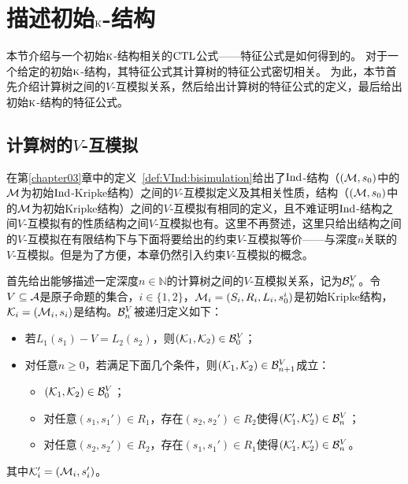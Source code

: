 \section{描述初始$\textsc{k}$-结构}\label{sec:chapter06_chaIntC}
本节介绍与一个初始$\textsc{k}$-结构相关的$\textrm{CTL}$公式——特征公式是如何得到的。
对于一个给定的初始$\textsc{k}$-结构，其特征公式其计算树的特征公式密切相关。
为此，本节首先介绍计算树之间的$V$-互模拟关系，然后给出计算树的特征公式的定义，最后给出初始$\textsc{k}$-结构的特征公式。

\subsection{计算树的$V$-互模拟}
在第\ref{chapter03}章中的定义~\ref{def:VInd:bisimulation}给出了$\textrm{Ind}$-结构（$({\cal M},s_0)$中的${\cal M}$为初始$\textrm{Ind}$-Kripke结构）之间的$V$-互模拟定义及其相关性质，结构（$({\cal M},s_0)$中的${\cal M}$为初始Kripke结构）之间的$V$-互模拟有相同的定义，且不难证明$\textrm{Ind}$-结构之间$V$-互模拟有的性质结构之间$V$-互模拟也有。这里不再赘述，这里只给出结构之间的$V$-互模拟在有限结构下与下面将要给出的约束$V$-互模拟等价——与深度$n$关联的$V$-互模拟。但是为了方便，本章仍然引入约束$V$-互模拟的概念。

首先给出能够描述一定深度$n\in \mathbb{N}$的计算树之间的$V$-互模拟关系，记为${\cal B}_n^V$。令$V\subseteq {\cal A}$是原子命题的集合，$i\in \{1,2\}$，${\cal M}_i=(S_i,R_i,L_i,s_0^i)$是初始Kripke结构，${\cal K}_i=({\cal M}_i, s_i)$是结构。${\cal B}_n^V$被递归定义如下：
\begin{itemize}
	\item 若$L_1(s_1)-V=L_2(s_2)$，则$({\cal K}_1,{\cal K}_2) \in {\cal B}_0^V$；
	\item 对任意$n\ge 0$，若满足下面几个条件，则$({\cal K}_1,{\cal K}_2)\in {\cal B}_{n+1}^V$成立：
	\begin{itemize}
		\item $({\cal K}_1,{\cal K}_2) \in {\cal B}_0^V$；
		\item 对任意$(s_1,s_1')\in R_1$，存在$(s_2,s_2')\in R_2$使得$({\cal K}_1',{\cal K}_2') \in {\cal B}_n^V$；
		\item 对任意$(s_2,s_2')\in R_2$，存在$(s_1,s_1')\in R_1$使得$({\cal K}_1',{\cal K}_2') \in {\cal B}_n^V$。
	\end{itemize}
\end{itemize}
其中${\cal K}_i'=({\cal M}_i,s_i')$。

